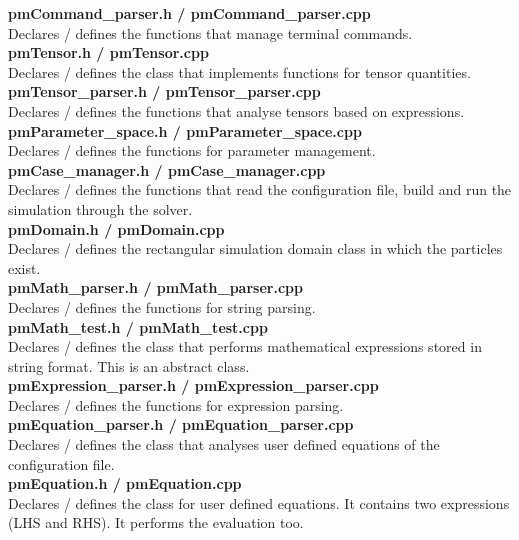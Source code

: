 \documentclass[a4paper,12pt,openany]{book}
\theoremstyle{break}
\begin{document}
\textbf{pmCommand\_parser.h / pmCommand\_parser.cpp} \\
Declares / defines the functions that manage terminal commands. \\

\textbf{pmTensor.h / pmTensor.cpp} \\
Declares / defines the class that implements functions for tensor quantities. \\

\textbf{pmTensor\_parser.h / pmTensor\_parser.cpp} \\
Declares / defines the functions that analyse tensors based on expressions. \\

\textbf{pmParameter\_space.h / pmParameter\_space.cpp} \\
Declares / defines the functions for parameter management. \\

\textbf{pmCase\_manager.h / pmCase\_manager.cpp} \\
Declares / defines the functions that read the configuration file, build and run the simulation through the solver. \\

\textbf{pmDomain.h / pmDomain.cpp} \\
Declares / defines the rectangular simulation domain class in which the particles exist. \\

\textbf{pmMath\_parser.h / pmMath\_parser.cpp} \\
Declares / defines the functions for string parsing. \\

\textbf{pmMath\_test.h / pmMath\_test.cpp} \\
Declares / defines the class that performs mathematical expressions stored in string format. This is an abstract class. \\

\textbf{pmExpression\_parser.h / pmExpression\_parser.cpp} \\
Declares / defines the functions for expression parsing. \\

\textbf{pmEquation\_parser.h / pmEquation\_parser.cpp} \\
Declares / defines the class that analyses user defined equations of the configuration file. \\

\textbf{pmEquation.h / pmEquation.cpp} \\
Declares / defines the class for user defined equations. It contains two expressions (LHS and RHS). It performs the evaluation too. \\
\end{document}
